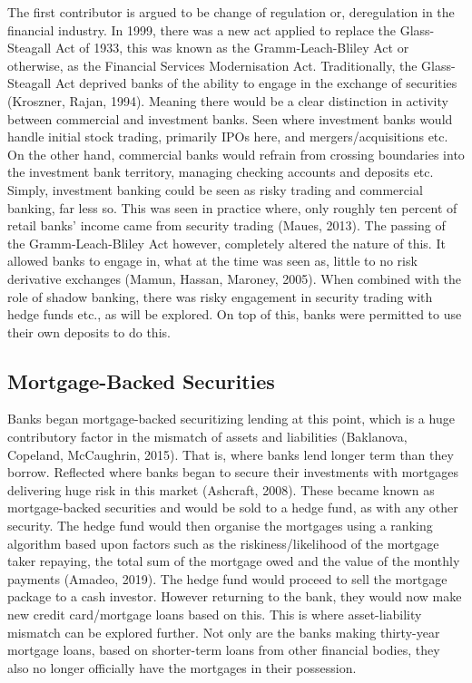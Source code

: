 \documentclass[11pt, english]{article}
\begin{document}
	The first contributor is argued to be change of regulation or, deregulation in the financial industry. In 1999, there was a new act applied to replace the Glass-Steagall Act of 1933, this was known as the Gramm-Leach-Bliley Act or otherwise, as the Financial Services Modernisation Act. Traditionally, the Glass-Steagall Act deprived banks of the ability to engage in the exchange of securities (Kroszner, Rajan, 1994). Meaning there would be a clear distinction in activity between commercial and investment banks. Seen where investment banks would handle initial stock trading, primarily IPOs here, and mergers/acquisitions etc. On the other hand, commercial banks would refrain from crossing boundaries into the investment bank territory, managing checking accounts and deposits etc. Simply, investment banking could be seen as risky trading and commercial banking, far less so. This was seen in practice where, only roughly ten percent of retail banks’ income came from security trading (Maues, 2013). The passing of the Gramm-Leach-Bliley Act however, completely altered the nature of this. It allowed banks to engage in, what at the time was seen as, little to no risk derivative exchanges (Mamun, Hassan, Maroney, 2005). When combined with the role of shadow banking, there was risky engagement in security trading with hedge funds etc., as will be explored. On top of this, banks were permitted to use their own deposits to do this. 

	\subsection{Mortgage-Backed Securities}

	Banks began mortgage-backed securitizing lending at this point, which is a huge contributory factor in the mismatch of assets and liabilities (Baklanova, Copeland, McCaughrin, 2015). That is, where banks lend longer term than they borrow. Reflected where banks began to secure their investments with mortgages delivering huge risk in this market (Ashcraft, 2008). These became known as mortgage-backed securities and would be sold to a hedge fund, as with any other security. The hedge fund would then organise the mortgages using a ranking algorithm based upon factors such as the riskiness/likelihood of the mortgage taker repaying, the total sum of the mortgage owed and the value of the monthly payments (Amadeo, 2019). The hedge fund would proceed to sell the mortgage package to a cash investor. However returning to the bank, they would now make new credit card/mortgage loans based on this. This is where asset-liability mismatch can be explored further. Not only are the banks making thirty-year mortgage loans, based on shorter-term loans from other financial bodies, they also no longer officially have the mortgages in their possession.
\end{document}
